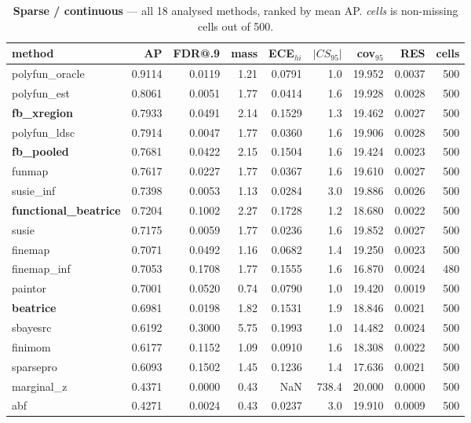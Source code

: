 \begin{table}[htbp]\centering\small
\caption{\textbf{Sparse / continuous} --- all 18 analysed methods, ranked by mean AP. \emph{cells} is non-missing cells out of 500.}
\label{tab:main-sparse-continuous}
\begin{tabular}{lrrrrrrr r}\toprule
method & AP & FDR@.9 & mass & ECE$_{hi}$ & $|CS_{95}|$ & cov$_{95}$ & RES & cells\\\midrule
polyfun\_oracle & 0.9114 & 0.0119 & 1.21 & 0.0791 & 1.0 & 19.952 & 0.0037 & 500\\
polyfun\_est & 0.8061 & 0.0051 & 1.77 & 0.0414 & 1.6 & 19.928 & 0.0028 & 500\\
\textbf{fb\_xregion} & 0.7933 & 0.0491 & 2.14 & 0.1529 & 1.3 & 19.462 & 0.0027 & 500\\
polyfun\_ldsc & 0.7914 & 0.0047 & 1.77 & 0.0360 & 1.6 & 19.906 & 0.0028 & 500\\
\textbf{fb\_pooled} & 0.7681 & 0.0422 & 2.15 & 0.1504 & 1.6 & 19.424 & 0.0023 & 500\\
funmap & 0.7617 & 0.0227 & 1.77 & 0.0367 & 1.6 & 19.610 & 0.0027 & 500\\
susie\_inf & 0.7398 & 0.0053 & 1.13 & 0.0284 & 3.0 & 19.886 & 0.0026 & 500\\
\textbf{functional\_beatrice} & 0.7204 & 0.1002 & 2.27 & 0.1728 & 1.2 & 18.680 & 0.0022 & 500\\
susie & 0.7175 & 0.0059 & 1.77 & 0.0236 & 1.6 & 19.852 & 0.0027 & 500\\
finemap & 0.7071 & 0.0492 & 1.16 & 0.0682 & 1.4 & 19.250 & 0.0023 & 500\\
finemap\_inf & 0.7053 & 0.1708 & 1.77 & 0.1555 & 1.6 & 16.870 & 0.0024 & 480\\
paintor & 0.7001 & 0.0520 & 0.74 & 0.0790 & 1.0 & 19.420 & 0.0019 & 500\\
\textbf{beatrice} & 0.6981 & 0.0198 & 1.82 & 0.1531 & 1.9 & 18.846 & 0.0021 & 500\\
sbayesrc & 0.6192 & 0.3000 & 5.75 & 0.1993 & 1.0 & 14.482 & 0.0024 & 500\\
finimom & 0.6177 & 0.1152 & 1.09 & 0.0910 & 1.6 & 18.308 & 0.0022 & 500\\
sparsepro & 0.6093 & 0.1502 & 1.45 & 0.1236 & 1.4 & 17.636 & 0.0021 & 500\\
marginal\_z & 0.4371 & 0.0000 & 0.43 & NaN & 738.4 & 20.000 & 0.0000 & 500\\
abf & 0.4271 & 0.0024 & 0.43 & 0.0237 & 3.0 & 19.910 & 0.0009 & 500\\
\bottomrule\end{tabular}\end{table}
